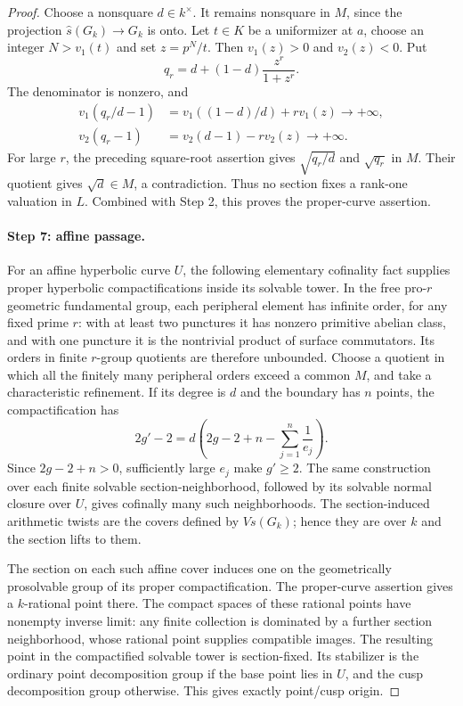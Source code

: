 \begin{proof}
Choose a nonsquare $d\in k^\times$.  It remains nonsquare in $M$,
since the projection $\widehat s(G_k)\to G_k$ is onto.  Let $t\in K$
be a uniformizer at $a$, choose an integer $N>v_1(t)$ and set
$z=p^N/t$.  Then $v_1(z)>0$ and $v_2(z)<0$.  Put
\[
                    q_r=d+(1-d)\frac{z^r}{1+z^r}.
\]
The denominator is nonzero, and
\[
\begin{aligned}
 v_1(q_r/d-1)&=v_1((1-d)/d)+r v_1(z)\longrightarrow+\infty,\\
 v_2(q_r-1)&=v_2(d-1)-r v_2(z)\longrightarrow+\infty.
\end{aligned}
\]
For large $r$, the preceding square-root assertion gives
$\sqrt{q_r/d}$ and $\sqrt{q_r}$ in $M$.  Their quotient gives
$\sqrt d\in M$, a contradiction.  Thus no section fixes a
rank-one valuation in $L$.  Combined with Step 2, this proves
the proper-curve assertion.

\paragraph{Step 7: affine passage.}

For an affine hyperbolic curve $U$, the following elementary
cofinality fact supplies proper hyperbolic compactifications inside
its solvable tower.  In the free pro-$r$ geometric fundamental
group, each peripheral element has infinite order, for any fixed
prime $r$: with at least two punctures it has nonzero primitive
abelian class, and with one puncture it is the nontrivial product
of surface commutators.  Its orders in finite $r$-group quotients
are therefore unbounded.  Choose a quotient in which all the
finitely many peripheral orders exceed a common $M$, and take a
characteristic refinement.  If its degree is $d$ and the boundary
has $n$ points, the compactification has
\[
     2g'-2=d\left(2g-2+n-\sum_{j=1}^{n}\frac1{e_j}\right).
\]
Since $2g-2+n>0$, sufficiently large $e_j$ make $g'\ge2$.
The same construction over each finite solvable section-neighborhood,
followed by its solvable normal closure over $U$, gives cofinally
many such neighborhoods.  The section-induced arithmetic twists
are the covers defined by $V s(G_k)$; hence they are over $k$ and
the section lifts to them.

The section on each such affine cover induces one on the
geometrically prosolvable group of its proper compactification.
The proper-curve assertion gives a $k$-rational point there.
The compact spaces of these rational points have nonempty inverse
limit: any finite collection is dominated by a further section
neighborhood, whose rational point supplies compatible images.
The resulting point in the compactified solvable tower is
section-fixed.  Its stabilizer is the ordinary point decomposition
group if the base point lies in $U$, and the cusp decomposition
group otherwise.  This gives exactly point/cusp origin.

\end{proof}
